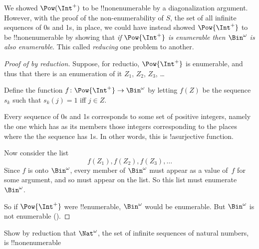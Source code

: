 \documentclass[../../include/open-logic-section]{subfiles}
\begin{document}


We showed $\Pow(\Int^+)$ to be !!{nonenumerable} by a diagonalization
argument. However, with the proof of the non-enumerability of $S$, the
set of all infinite sequences of 0s and 1s, in place, we could have
instead showed $\Pow{\Int^+}$ to be !!{nonenumerable} by showing that
\emph{if $\Pow{\Int^+}$ is enumerable then $\Bin^\omega$ is also
  enumerable}. This called \emph{reducing} one problem to another.

\begin{proof}[Proof of {} by reduction]
Suppose, for reductio, $\Pow{\Int^+}$ is enumerable, and thus that
there is an enumeration of it $Z_{1}$, $Z_{2}$, $Z_{3}$, \dots

Define the function $f \colon \Pow{\Int^+} \to \Bin^\omega$ by letting
$f(Z)$ be the sequence $s_{k}$ such that $s_{k}(j) = 1$ iff $j \in Z$.

Every sequence of 0s and 1s corresponds to some set of positive
integers, namely the one which has as its members those integers
corresponding to the places where the the sequence has 1s. In other
words, this is !a{surjective} function.

Now consider the list 
\[
f(Z_1), f(Z_2), f(Z_3), \dots
\]
Since $f$ is onto $\Bin^\omega$, every member of $\Bin^\omega$ must
appear as a value of~$f$ for some argument, and so must appear on the
list. So this list must enumerate~$\Bin^\omega$.

So if $\Pow{\Int^+}$ were !!{enumerable}, $\Bin^\omega$ would be enumerable.
But $\Bin^\omega$ is not enumerable ().
\end{proof}

\begin{prob}
Show by reduction that $\Nat^\omega$, the set of infinite sequences of
natural numbers, is !!{nonenumerable}
\end{prob}
\end{document}
